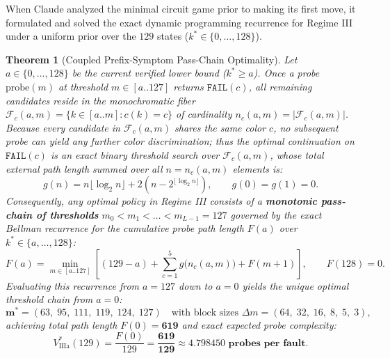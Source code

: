 \documentclass[11pt,a4paper]{article}
\newtheorem{theorem}{Theorem}[section]
\theoremstyle{definition}
\theoremstyle{remark}
\begin{document}
When Claude analyzed the minimal circuit game prior to making its first move, it formulated and solved the exact dynamic programming recurrence for Regime III under a uniform prior over the $129$ states ($k^* \in \{0,\dots,128\}$).

\begin{theorem}[Coupled Prefix-Symptom Pass-Chain Optimality]
Let $a \in \{0,\dots,128\}$ be the current verified lower bound ($k^* \ge a$). Once a probe $\text{probe}(m)$ at threshold $m \in [a..127]$ returns $\texttt{FAIL}(c)$, all remaining candidates reside in the monochromatic fiber $\mathcal{F}_c(a, m) = \{k \in [a..m] : c(k) = c\}$ of cardinality $n_c(a, m) = |\mathcal{F}_c(a, m)|$. Because every candidate in $\mathcal{F}_c(a, m)$ shares the same color $c$, no subsequent probe can yield any further color discrimination; thus the optimal continuation on $\texttt{FAIL}(c)$ is an exact binary threshold search over $\mathcal{F}_c(a, m)$, whose total external path length summed over all $n = n_c(a, m)$ elements is:
\begin{equation}
    g(n) = n \lfloor \log_2 n \rfloor + 2\left(n - 2^{\lfloor \log_2 n \rfloor}\right), \qquad g(0) = g(1) = 0.
\end{equation}
Consequently, any optimal policy in Regime III consists of a \textbf{monotonic pass-chain of thresholds} $m_0 < m_1 < \dots < m_{L-1} = 127$ governed by the exact Bellman recurrence for the cumulative probe path length $F(a)$ over $k^* \in \{a,\dots,128\}$:
\begin{equation}
    F(a) = \min_{m \in [a..127]} \left[ (129 - a) + \sum_{c=1}^{5} g\big(n_c(a, m)\big) + F(m + 1) \right], \qquad F(128) = 0.
\end{equation}
Evaluating this recurrence from $a = 127$ down to $a = 0$ yields the unique optimal threshold chain from $a = 0$:
\begin{equation}
    \bm{m}^* = (63,\; 95,\; 111,\; 119,\; 124,\; 127) \quad \text{with block sizes } \Delta m = (64,\; 32,\; 16,\; 8,\; 5,\; 3),
\end{equation}
achieving total path length $F(0) = \mathbf{619}$ and exact expected probe complexity:
\begin{equation}
    V_{\text{IIIa}}^*(129) = \frac{F(0)}{129} = \mathbf{\frac{619}{129} \approx 4.798450\text{ probes per fault}}.
\end{equation}
\end{theorem}
\end{document}
